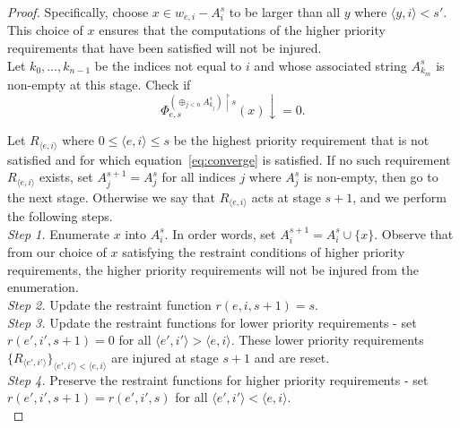 \documentclass{article}
\begin{document}
\begin{enumerate}[label={(\roman*)}]
\begin{proof}
        Specifically, choose $x\in w_{e,i}-A_i^s$ to be larger than all $y$
        where $\langle y,i\rangle <s'$. This choice of $x$ ensures that the
        computations of the higher priority requirements that have been
        satisfied will not be injured. \\

        Let $k_0,\ldots,k_{n-1}$ be the indices not equal to $i$ and whose
        associated string $A_{k_m}^s$ is non-empty at this stage. Check if
        \begin{equation}
          \Phi_{e,s}^{(\oplus_{j<n} A_{k_j}^s) \restriction s}(x)
          \downarrow=0.
          \label{eq:converge}
        \end{equation}

        Let $R_{\langle e,i\rangle}$ where $0\leq \langle e,i\rangle \leq
        s$ be the highest priority requirement that is not satisfied and
        for which equation~\eqref{eq:converge} is satisfied. If no such
        requirement $R_{\langle e,i\rangle}$ exists, set
        $A_j^{s+1}=A_j^s$ for all indices $j$ where $A_j^s$ is non-empty,
        then go to the next stage. Otherwise we say that $R_{\langle
        e,i\rangle}$ acts at stage $s+1$, and we perform the following
        steps. \\

        \textit{Step 1.} Enumerate $x$ into $A_i^s$. In order words, set
        $A_i^{s+1}=A_i^s\cup\{x\}$. Observe that from our choice of $x$
        satisfying the restraint conditions of higher priority
        requirements, the higher priority requirements will not be injured
        from the enumeration. \\

        \textit{Step 2.} Update the restraint function $r(e,i,s+1)=s$. \\

        \textit{Step 3.} Update the restraint functions for lower priority
        requirements - set $r(e',i',s+1)=0$ for all $\langle e',i'\rangle
        >\langle e,i\rangle$. These lower priority requirements
        $\{R_{\langle e',i'\rangle}\}_{\langle e',i'\rangle <\langle
        e,i\rangle}$ are injured at stage $s+1$ and are reset. \\

        \textit{Step 4.} Preserve the restraint functions for higher
        priority requirements - set $r(e',i',s+1)=r(e',i',s)$ for all
        $\langle e',i'\rangle <\langle e,i\rangle$. \\


\end{proof}
\end{enumerate}
\end{document}
